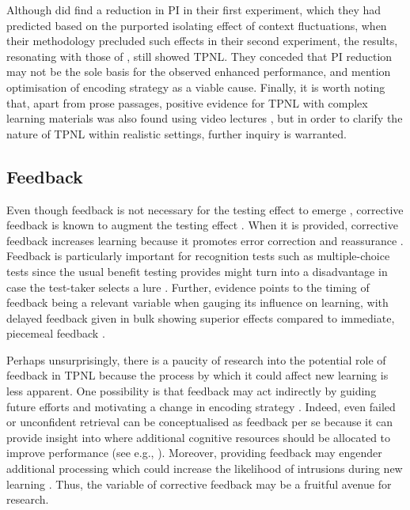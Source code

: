 \documentclass[../main.tex]{subfiles}
\begin{document}
Although \cite{divisRetrievalSpeedsContext2014} did find a reduction in PI 
in their first experiment, which they had predicted based on the purported 
isolating effect of context fluctuations, when their methodology precluded 
such effects in their second experiment, the results, resonating with those 
of \cite{wissmanInterimTestEffect2011}, still showed TPNL. They conceded 
that PI reduction may not be the sole basis for the observed enhanced 
performance, and mention optimisation of encoding strategy as a viable 
cause. Finally, it is worth noting that, apart from prose passages, positive 
evidence for TPNL with complex learning materials was also found using video 
lectures \citep{szpunarInterpolatedMemoryTests2013, 
	jingInterpolatedTestingInfluences2016}, but in order to clarify the
nature of TPNL within realistic settings, further inquiry is warranted.

\hypertarget{feedback}{%
\subsection{Feedback}}

Even though feedback is not necessary for the testing effect to emerge 
\citep{roedigeriiiTestEnhancedLearningTaking2006}, corrective feedback is 
known to augment the testing effect 
\citep{roedigeriiiCriticalRoleRetrieval2011}. When it is provided, 
corrective feedback increases learning because it promotes error correction 
\citep{pashlerWhenDoesFeedback2005} and reassurance 
\citep{butlerCorrectingMetacognitiveError2008}. Feedback is particularly 
important for recognition tests such as multiple-choice tests since the 
usual benefit testing provides might turn into a disadvantage in case the 
test-taker selects a lure 
\citep{roedigeriiiPositiveNegativeConsequences2005, 
	marshMemorialConsequencesMultiplechoice2007}. Further, evidence points 
	to the timing of feedback being a relevant variable when gauging its 
	influence on learning, with delayed feedback given in bulk showing 
	superior effects compared to immediate, piecemeal feedback 
\citep{metcalfeDelayedImmediateFeedback2009,butlerEffectTypeTiming2007, 
	butlerFeedbackEnhancesPositive2008,smithLearningFeedbackSpacing2010}.

Perhaps unsurprisingly, there is a paucity of research into the potential 
role of feedback in TPNL because the process by which it could affect new 
learning is less apparent. One possibility is that feedback may act 
indirectly by guiding future efforts and motivating a change in encoding 
strategy \citep{roedigeriiiPowerTestingMemory2006}. Indeed, even failed or 
unconfident retrieval can be conceptualised as feedback per se because it 
can provide insight into where additional cognitive resources should be 
allocated to improve performance (see e.g., 
\citealp{kornellUnsuccessfulRetrievalAttempts2009}). Moreover, providing 
feedback may engender additional processing 
\citep{bangert-drownsInstructionalEffectFeedback1991} which could increase 
the likelihood of intrusions during new learning 
\citep{chanRetrievalPotentiatesNew2018}. Thus, the variable of corrective 
feedback may be a fruitful avenue for research.
\end{document}

